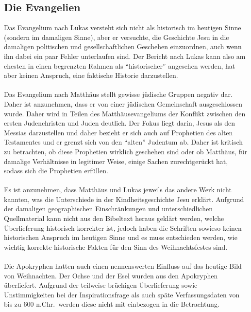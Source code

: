 \subsection*{Die Evangelien}
Das Evangelium nach Lukas versteht sich nicht als historisch im heutigen Sinne (sondern im damaligen Sinne), aber er versuchte, die Geschichte Jesu in die damaligen politischen und gesellschaftlichen Geschehen einzuordnen, auch wenn ihn dabei ein paar Fehler unterlaufen sind. Der Bericht nach Lukas kann also am ehesten in einen begrenzten Rahmen als ``historischer'' angesehen werden, hat aber keinen Anspruch, eine faktische Historie darzustellen.
\\~\\
Das Evangelium nach Matthäus stellt gewisse jüdische Gruppen negativ dar. Daher ist anzunehmen, dass er von einer jüdischen Gemeinschaft ausgeschlossen wurde. Daher wird in Teilen des Matthäusevangeliums der Konflikt zwischen den ersten Judenchristen und Juden deutlich. Der Fokus liegt darin, Jesus als den Messias darzustellen und daher bezieht er sich auch auf Prophetien des alten Testamentes und er grenzt sich von den ``alten'' Judentum ab. Daher ist kritisch zu betrachten, ob diese Prophetien wirklich geschehen sind oder ob Matthäus, für damalige Verhältnisse in legitimer Weise, einige Sachen zurechtgerückt hat, sodass sich die Prophetien erfüllen.
\\~\\
Es ist anzunehmen, dass Matthäus und Lukas jeweils das andere Werk nicht kannten, was die Unterschiede in der Kindheitsgeschichte Jesu erklärt. Aufgrund der damaligen geographischen Einschränkungen und unterschiedlichen Quellmaterial kann nicht aus den Bibeltext heraus geklärt werden, welche Überlieferung historisch korrekter ist, jedoch haben die Schriften sowieso keinen historischen Anspruch im heutigen Sinne und es muss entschieden werden, wie wichtig korrekte historische Fakten für den Sinn des Weihnachtsfestes sind.
\\~\\
Die Apokryphen hatten auch einen nennenswerten Einfluss auf das heutige Bild von Weihnachten. Der Ochse und der Esel wurden aus den Apokryphen überliefert. Aufgrund der teilweise brüchigen Überlieferung sowie Unstimmigkeiten bei der Inspirationsfrage als auch späte Verfassungsdaten von bis zu 600 n.Chr.\ werden diese nicht mit einbezogen in die Betrachtung.
\\~\\
